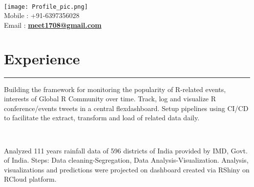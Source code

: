 \documentclass[]{meetresume-class}
\begin{document}
	\begin{minipage}[t]{0.66\textwidth} 
		\hspace*{0pt}\hfill    \\
		\hspace*{0pt}\hfill \texttt{[image: Profile\_pic.png]}\\
		\hspace*{0pt}\hfill Mobile : +91-6397356028 \\
		\hspace*{0pt}\hfill Email : \textbf{\href{mailto:meet1708@gmail.com}{meet1708@gmail.com}}

		\section{Experience}
		\noindent\rule{12.5cm}{0.4pt}
		 
		\noindent
		\hspace{5em}%
		\begin{minipage}{0.85\textwidth\vspace{2pt}}
			 Building the framework for monitoring the popularity of R-related events, interests of Global R Community over time. Track, log and visualize R conference/events tweets in a central flexdashboard. Setup pipelines using CI/CD to facilitate the extract, transform and load of related data daily.
		\end{minipage}
		\sectionsep
		\hspace*{0pt}\hfill  \\
		
		 
		\noindent
		\hspace{5em}%
		\begin{minipage}{0.85\textwidth\vspace{2pt}}
			Analyzed 111 years rainfall data of 596 districts of India provided by IMD, Govt. of India. Steps: Data cleaning-Segregation, Data Analysis-Visualization. Analysis, visualizations and predictions were projected on dashboard created via RShiny on RCloud platform.
		\end{minipage}
		\sectionsep
		

\end{minipage}
\end{document}
